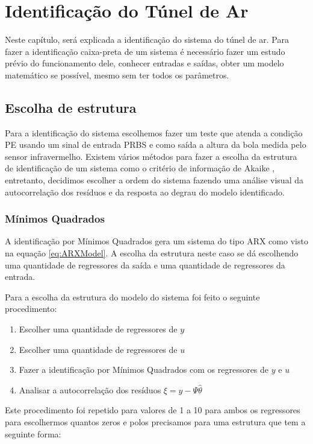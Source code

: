 \chapter{Identificação do Túnel de Ar} \label{cap4}

Neste capítulo, será explicada a identificação do sistema do túnel de ar. Para fazer a identificação caixa-preta de um sistema é necessário fazer um estudo prévio do funcionamento dele, conhecer entradas e saídas, obter um modelo matemático se possível, mesmo sem ter todos os parâmetros.
\section{Escolha de estrutura}
Para a identificação do sistema escolhemos fazer um teste que atenda a condição PE \cite{katayama2005} usando um sinal de entrada PRBS e como saída a altura da bola medida pelo sensor infravermelho. Existem vários métodos para fazer a escolha da estrutura de identificação de um sistema como o critério de informação de Akaike \cite{akaike1974}, entretanto, decidimos escolher a ordem do sistema fazendo uma análise visual da autocorrelação dos resíduos e da resposta ao degrau do modelo identificado.

\subsection{Mínimos Quadrados}\label{s:4mq}

A identificação por Mínimos Quadrados gera um sistema do tipo ARX como visto na equação \eqref{eq:ARXModel}. A escolha da estrutura neste caso se dá escolhendo uma quantidade de regressores da saída e uma quantidade de regressores da entrada. 


Para a escolha da estrutura do modelo do sistema foi feito o seguinte procedimento:
\begin{enumerate}
	\item Escolher uma quantidade de regressores de $y$
	\item Escolher uma quantidade de regressores de $u$
	\item Fazer a identificação por Mínimos Quadrados com os regressores de $y$ e $u$
	\item Analisar a autocorrelação dos resíduos $\xi=y-\Psi \hat{\theta}$
\end{enumerate}

Este procedimento foi repetido para valores de 1 a 10 para ambos os regressores para escolhermos quantos zeros e polos precisamos para uma estrutura que tem a seguinte forma:

